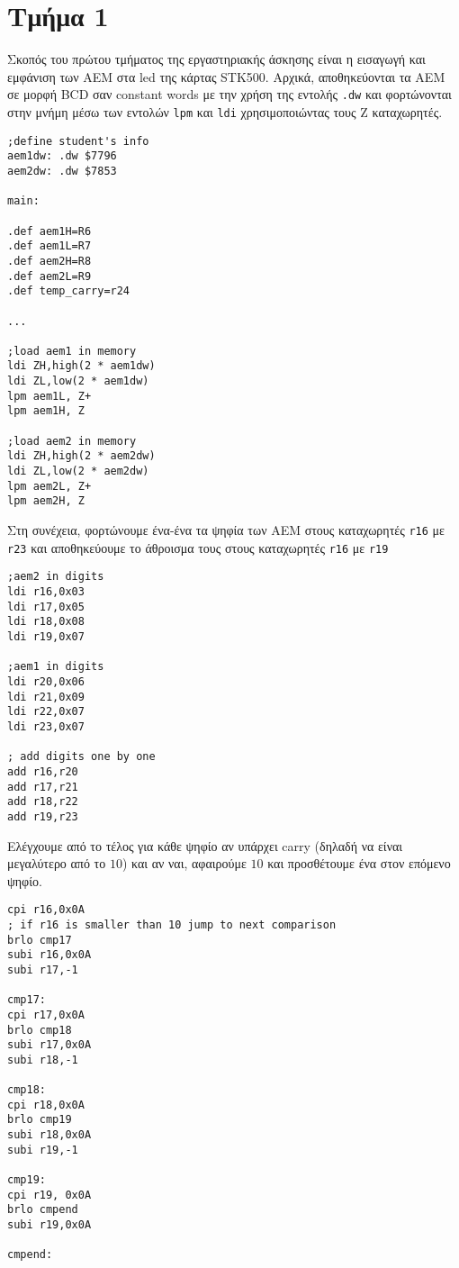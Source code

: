 \chapter{Τμήμα 1}

Σκοπός του πρώτου τμήματος της εργαστηριακής άσκησης είναι η εισαγωγή και εμφάνιση των ΑΕΜ στα led της κάρτας STK500.
Αρχικά, αποθηκεύονται τα ΑΕΜ σε μορφή BCD σαν constant words με την χρήση της εντολής \lstinline!.dw! και φορτώνονται στην μνήμη μέσω των εντολών \lstinline!lpm! και \lstinline!ldi! χρησιμοποιώντας τους Z καταχωρητές.
\begin{lstlisting}
;define student's info
aem1dw: .dw $7796
aem2dw: .dw $7853

main:

.def aem1H=R6
.def aem1L=R7
.def aem2H=R8
.def aem2L=R9
.def temp_carry=r24

...

;load aem1 in memory
ldi ZH,high(2 * aem1dw)
ldi ZL,low(2 * aem1dw)
lpm aem1L, Z+
lpm aem1H, Z

;load aem2 in memory
ldi ZH,high(2 * aem2dw)
ldi ZL,low(2 * aem2dw)
lpm aem2L, Z+
lpm aem2H, Z
\end{lstlisting}

Στη συνέχεια, φορτώνουμε ένα-ένα τα ψηφία των ΑΕΜ στους καταχωρητές \lstinline!r16! με \lstinline!r23! και αποθηκεύουμε το άθροισμα τους στους καταχωρητές \lstinline!r16! με \lstinline!r19!
\begin{lstlisting}
;aem2 in digits
ldi r16,0x03
ldi r17,0x05
ldi r18,0x08
ldi r19,0x07

;aem1 in digits
ldi r20,0x06
ldi r21,0x09
ldi r22,0x07
ldi r23,0x07

; add digits one by one
add r16,r20
add r17,r21
add r18,r22
add r19,r23
\end{lstlisting}

Ελέγχουμε από το τέλος για κάθε ψηφίο αν υπάρχει carry (δηλαδή να είναι μεγαλύτερο από το $10$)
και αν ναι, αφαιρούμε $10$ και προσθέτουμε ένα στον επόμενο ψηφίο.

\begin{lstlisting}
cpi r16,0x0A
; if r16 is smaller than 10 jump to next comparison
brlo cmp17
subi r16,0x0A
subi r17,-1

cmp17:
cpi r17,0x0A
brlo cmp18
subi r17,0x0A
subi r18,-1

cmp18:
cpi r18,0x0A
brlo cmp19
subi r18,0x0A
subi r19,-1

cmp19:
cpi r19, 0x0A
brlo cmpend
subi r19,0x0A

cmpend:
\end{lstlisting}


